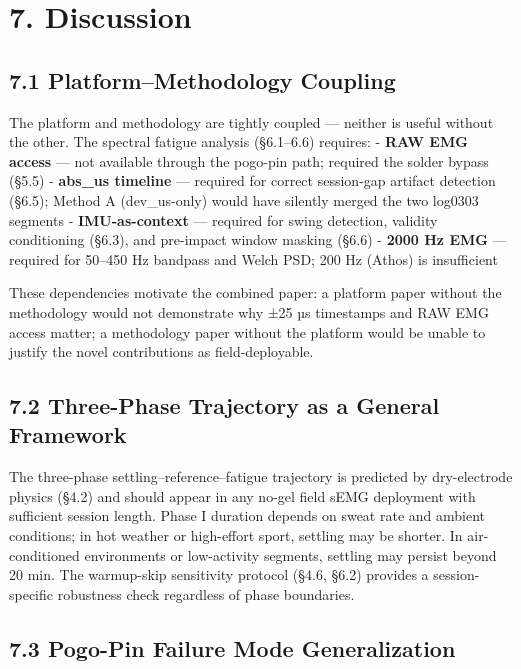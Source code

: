 \documentclass[sensors,article,submit,pdftex,moreauthors]{Definitions/mdpi}
\begin{document}
\section{7. Discussion}\label{discussion}

\subsection{7.1 Platform--Methodology Coupling}\label{platformmethodology-coupling}

The platform and methodology are tightly coupled --- neither is useful without the other.
The spectral fatigue analysis (§6.1--6.6) requires:
- \textbf{RAW EMG access} --- not available through the pogo-pin path; required the solder bypass (§5.5)
- \textbf{abs\_us timeline} --- required for correct session-gap artifact detection (§6.5); Method A
(dev\_us-only) would have silently merged the two log0303 segments
- \textbf{IMU-as-context} --- required for swing detection, validity conditioning (§6.3), and
pre-impact window masking (§6.6)
- \textbf{2000 Hz EMG} --- required for 50--450 Hz bandpass and Welch PSD; 200 Hz (Athos) is insufficient

These dependencies motivate the combined paper: a platform paper without the methodology would
not demonstrate why ±25 µs timestamps and RAW EMG access matter; a methodology paper without
the platform would be unable to justify the novel contributions as field-deployable.

\subsection{7.2 Three-Phase Trajectory as a General Framework}\label{three-phase-trajectory-as-a-general-framework}

The three-phase settling--reference--fatigue trajectory is predicted by dry-electrode physics
(§4.2) and should appear in any no-gel field sEMG deployment with sufficient session length.
Phase I duration depends on sweat rate and ambient conditions; in hot weather or high-effort
sport, settling may be shorter. In air-conditioned environments or low-activity segments,
settling may persist beyond 20 min. The warmup-skip sensitivity protocol (§4.6, §6.2) provides
a session-specific robustness check regardless of phase boundaries.

\subsection{7.3 Pogo-Pin Failure Mode Generalization}\label{pogo-pin-failure-mode-generalization}
\end{document}
